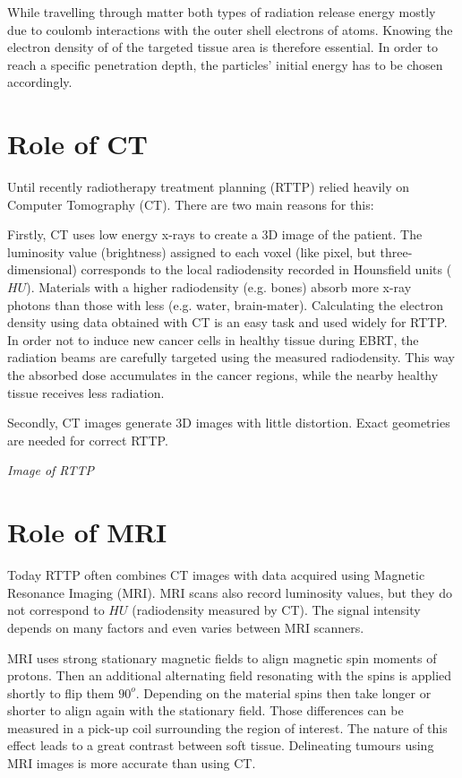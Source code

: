 While travelling through matter both types of radiation release energy mostly due to coulomb interactions with the outer shell electrons of atoms.
Knowing the electron density of of the targeted tissue area is therefore essential. In order to reach a specific penetration depth, the particles' initial energy has to be chosen accordingly.

\section{Role of CT}

Until recently radiotherapy treatment planning (RTTP) relied heavily on Computer Tomography (CT). There are two main reasons for this:

Firstly, CT uses low energy x-rays to create a 3D image of the patient. The luminosity value (brightness) assigned to each voxel (like pixel, but three-dimensional) corresponds to
the local radiodensity recorded in Hounsfield units ($HU$). Materials with a higher radiodensity (e.g. bones) absorb more x-ray photons than those with less (e.g. water, brain-mater).
Calculating the electron density using data obtained with CT is an easy task and used widely for RTTP. \cite{Constantinou2012, Schneider1996}
In order not to induce new cancer cells in healthy tissue during EBRT, the radiation beams are carefully targeted using the measured radiodensity. 
This way the absorbed dose accumulates in the cancer regions, while the nearby healthy tissue receives less radiation.

Secondly, CT images generate 3D images with little distortion. Exact geometries are needed for correct RTTP. %

\vspace{4cm}
\textit{Image of RTTP}
\vspace{2cm}

\section{Role of MRI}



Today RTTP often combines CT images with data acquired using Magnetic Resonance Imaging (MRI).
MRI scans also record luminosity values, but they do not correspond to $HU$ (radiodensity measured by CT).
The signal intensity depends on many factors and even varies between MRI scanners.

MRI uses strong stationary magnetic fields to align magnetic spin moments of protons. Then an additional alternating field resonating with the spins is applied shortly to flip them $90^o$.
Depending on the material spins then take longer or shorter to align again with the stationary field. Those differences can be measured in a pick-up coil surrounding the
region of interest. The nature of this effect leads to a great contrast between soft tissue. \cite{Currie2013} Delineating tumours using MRI images is more accurate than using CT.
\cite{Rasch1999, Debois1999a, Roach1996}

